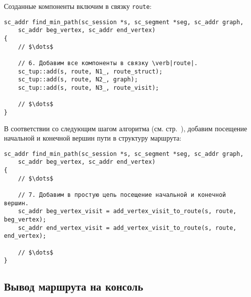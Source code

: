 Созданные компоненты включим в связку \lstinline|route|:
\begin{lstlisting}[texcl]
sc_addr find_min_path(sc_session *s, sc_segment *seg, sc_addr graph,
    sc_addr beg_vertex, sc_addr end_vertex)
{
    // $\dots$

    // 6. Добавим все компоненты в связку \verb|route|.
    sc_tup::add(s, route, N1_, route_struct);
    sc_tup::add(s, route, N2_, graph);
    sc_tup::add(s, route, N3_, route_visit);

    // $\dots$
}
\end{lstlisting}

В соответствии со следующим шагом алгоритма
(см. стр.~\pageref{S9_Add_begin_and_end_vertexes_visit_to_route_tuple}),
добавим посещение начальной и конечной вершин пути в структуру
маршрута:
\begin{lstlisting}[texcl]
sc_addr find_min_path(sc_session *s, sc_segment *seg, sc_addr graph,
    sc_addr beg_vertex, sc_addr end_vertex)
{
    // $\dots$

    // 7. Добавим в простую цепь посещение начальной и конечной вершин.
    sc_addr beg_vertex_visit = add_vertex_visit_to_route(s, route, beg_vertex);
    sc_addr end_vertex_visit = add_vertex_visit_to_route(s, route, end_vertex);

    // $\dots$
}
\end{lstlisting}



\subsection{Вывод маршрута на консоль}
\label{sec:libscprg_fmp_print_route}




